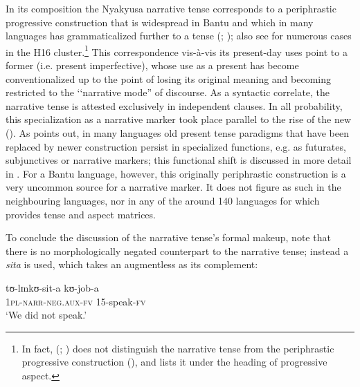 In its composition the Nyakyusa narrative tense corresponds to a periphrastic progressive construction that is widespread in Bantu and which in many languages has grammaticalized further to a  tense (\citealt{BastinY1989a}; \citeyear{BastinY1989b}); also see \citet{deKindJetal2015} for numerous cases in the  H16 cluster.\footnote{In fact, \citeauthor{LusekeloA2008} (\citeyear{LusekeloA2008}; \citeyear{LusekeloA2013}) does not distinguish the narrative tense from the periphrastic progressive construction (), and lists it under the heading of progressive aspect.} This correspondence vis-à-vis its present-day uses point to a former  (i.e. present imperfective), whose use as a  present has become conventionalized up to the point of losing its original meaning and becoming restricted to the \lq\lq narrative mode'' \citep{SmithC2003} of discourse. As a syntactic correlate, the narrative tense is attested exclusively in independent clauses. In all probability, this specialization as a narrative marker took place parallel to the rise of the new  (). As \citet{HaspelmathM1998} points out, in many languages old present tense paradigms that have been replaced by newer construction persist in specialized functions, e.g. as futurates, subjunctives or narrative markers; this functional shift is discussed in more detail in \citet{PersohnB2016}. For a Bantu language, however, this originally periphrastic construction  is a very uncommon source for a narrative marker. It does not figure as such in the neighbouring languages, nor in any of the around 140 languages for which \citet{NurseD2008} provides tense and aspect matrices. 

To conclude the discussion of the narrative tense's formal makeup, note that there is no morphologically negated counterpart to the narrative tense; instead a   \textit{sita} is used, which takes an augmentless  as its complement:

\begin{exe}
\ex \gll tʊ-lɪnkʊ-sit-a kʊ-job-a\\
\textsc{1pl}-\textsc{narr}-\textsc{neg.aux}-\textsc{fv} 15-speak-\textsc{fv}\\
\glt `We did not speak.'
\end{exe}

